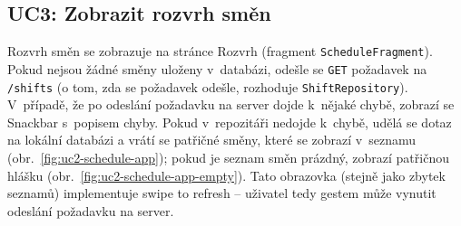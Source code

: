 \documentclass[twoside]{ctuthesis}
\begin{document}
\subsection{UC3: Zobrazit rozvrh směn}
\label{sub:uc3}

Rozvrh směn se zobrazuje na stránce Rozvrh (fragment \texttt{ScheduleFragment}). Pokud nejsou žádné směny uloženy v~databázi, odešle se \texttt{GET} požadavek na \texttt{/shifts} (o tom, zda se požadavek odešle, rozhoduje \texttt{ShiftRepository}). V~případě, že po odeslání požadavku na server dojde k~nějaké chybě, zobrazí se Snackbar s~popisem chyby. Pokud v~repozitáři nedojde k~chybě, udělá se dotaz na lokální databázi a vrátí se patřičné směny, které se zobrazí v~seznamu (obr.~\ref{fig:uc2-schedule-app}); pokud je seznam směn prázdný, zobrazí patřičnou hlášku (obr.~\ref{fig:uc2-schedule-app-empty}). Tato obrazovka (stejně jako zbytek seznamů) implementuje swipe to refresh -- uživatel tedy gestem  může vynutit odeslání požadavku na server.
\end{document}
